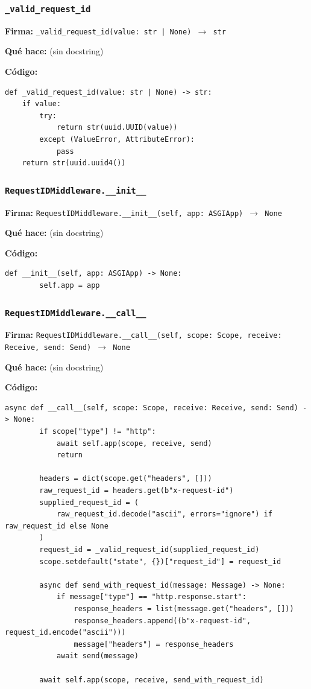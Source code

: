 \documentclass[11pt,a4paper]{article}
\begin{document}
\subsubsection*{\texttt{\_valid\_request\_id}}
\textbf{Firma:} \texttt{\_valid\_request\_id(value: str | None) $\rightarrow$ str}

\textbf{Qué hace:} (sin docstring)

\textbf{Código:}
\begin{lstlisting}
def _valid_request_id(value: str | None) -> str:
    if value:
        try:
            return str(uuid.UUID(value))
        except (ValueError, AttributeError):
            pass
    return str(uuid.uuid4())
\end{lstlisting}

\subsubsection*{\texttt{RequestIDMiddleware.\_\_init\_\_}}
\textbf{Firma:} \texttt{RequestIDMiddleware.\_\_init\_\_(self, app: ASGIApp) $\rightarrow$ None}

\textbf{Qué hace:} (sin docstring)

\textbf{Código:}
\begin{lstlisting}
def __init__(self, app: ASGIApp) -> None:
        self.app = app
\end{lstlisting}

\subsubsection*{\texttt{RequestIDMiddleware.\_\_call\_\_}}
\textbf{Firma:} \texttt{RequestIDMiddleware.\_\_call\_\_(self, scope: Scope, receive: Receive, send: Send) $\rightarrow$ None}

\textbf{Qué hace:} (sin docstring)

\textbf{Código:}
\begin{lstlisting}
async def __call__(self, scope: Scope, receive: Receive, send: Send) -> None:
        if scope["type"] != "http":
            await self.app(scope, receive, send)
            return

        headers = dict(scope.get("headers", []))
        raw_request_id = headers.get(b"x-request-id")
        supplied_request_id = (
            raw_request_id.decode("ascii", errors="ignore") if raw_request_id else None
        )
        request_id = _valid_request_id(supplied_request_id)
        scope.setdefault("state", {})["request_id"] = request_id

        async def send_with_request_id(message: Message) -> None:
            if message["type"] == "http.response.start":
                response_headers = list(message.get("headers", []))
                response_headers.append((b"x-request-id", request_id.encode("ascii")))
                message["headers"] = response_headers
            await send(message)

        await self.app(scope, receive, send_with_request_id)
\end{lstlisting}
\end{document}
